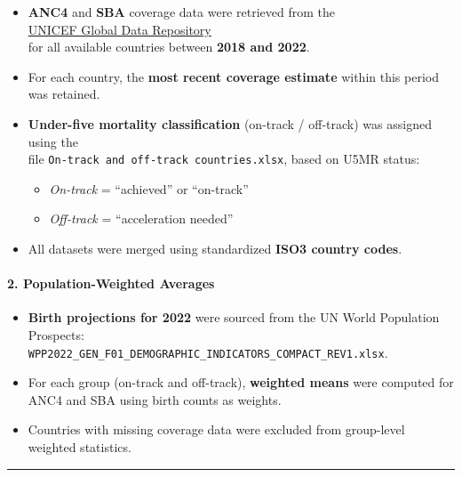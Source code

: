 \documentclass[
]{article}
\providecommand{\tightlist}{%
  \setlength{\itemsep}{0pt}\setlength{\parskip}{0pt}}
\begin{document}
\begin{itemize}
\tightlist
\item
  \textbf{ANC4} and \textbf{SBA} coverage data were retrieved from the\\
  \href{https://data.unicef.org/resources/data_explorer/unicef_f/?ag=UNICEF&df=GLOBAL_DATAFLOW&ver=1.0&dq=.MNCH_ANC4+MNCH_SAB.&startPeriod=2018&endPeriod=2022}{UNICEF
  Global Data Repository}\\
  for all available countries between \textbf{2018 and 2022}.
\item
  For each country, the \textbf{most recent coverage estimate} within
  this period was retained.
\item
  \textbf{Under-five mortality classification} (on-track / off-track)
  was assigned using the\\
  file \texttt{On-track\ and\ off-track\ countries.xlsx}, based on U5MR
  status:

  \begin{itemize}
  \tightlist
  \item
    \emph{On-track} = ``achieved'' or ``on-track''
  \item
    \emph{Off-track} = ``acceleration needed''
  \end{itemize}
\item
  All datasets were merged using standardized \textbf{ISO3 country
  codes}.
\end{itemize}

\paragraph{2. Population-Weighted
Averages}\label{population-weighted-averages}

\begin{itemize}
\tightlist
\item
  \textbf{Birth projections for 2022} were sourced from the UN World
  Population Prospects:\\
  \texttt{WPP2022\_GEN\_F01\_DEMOGRAPHIC\_INDICATORS\_COMPACT\_REV1.xlsx}.
\item
  For each group (on-track and off-track), \textbf{weighted means} were
  computed for ANC4 and SBA using birth counts as weights.
\item
  Countries with missing coverage data were excluded from group-level
  weighted statistics.
\end{itemize}

\begin{center}\rule{0.5\linewidth}{0.5pt}\end{center}
\end{document}
